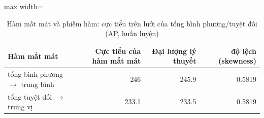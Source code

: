 \begin{table}[H]
\centering\small
\caption{Hàm mất mát và phiếm hàm: cực tiểu trên lưới của tổng bình phương/tuyệt đối (AP, huấn luyện)}\label{tab:tab_b12_13_loss_functional}
\begin{adjustbox}{max width=\linewidth}
\begin{tabular}{>{\raggedright\arraybackslash}p{}rrr}
\toprule
Hàm mất mát & Cực tiểu của hàm mất mát & Đại lượng lý thuyết & độ lệch (skewness) \\
\midrule
tổng bình phương $\to$ trung bình & 246 & 245.9 & 0.5819 \\
tổng tuyệt đối $\to$ trung vị & 233.1 & 233.5 & 0.5819 \\
\bottomrule
\end{tabular}
\end{adjustbox}
\end{table}
